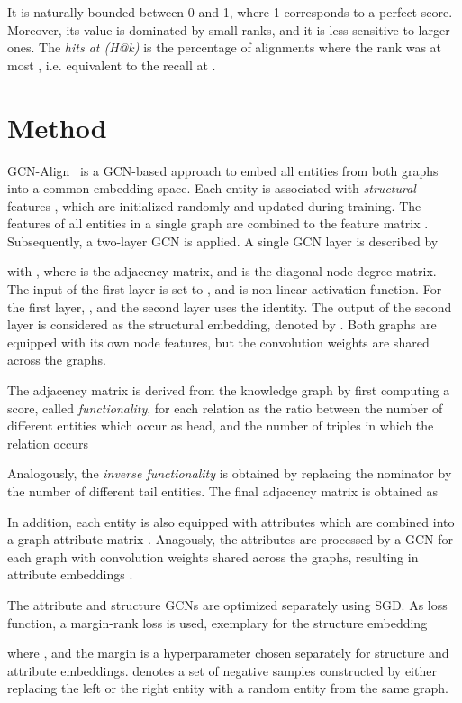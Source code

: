 \documentclass[runningheads]{llncs}
\begin{document}
It is naturally bounded between 0 and 1, where 1 corresponds to a perfect score.
Moreover, its value is dominated by small ranks, and it is less sensitive to larger ones.
The \emph{hits at  (H@k)} is the percentage of alignments where the rank was at most , i.e. equivalent to the recall at .
 \section{Method}
GCN-Align~\cite{DBLP:conf/emnlp/WangLLZ18} is a GCN-based approach to embed all entities from both graphs into a common embedding space.
Each entity  is associated with \emph{structural} features , which are initialized randomly and updated during training.
The features of all entities in a single graph are combined to the feature matrix .
Subsequently, a two-layer GCN is applied.
A single GCN layer is described by

with , where  is the adjacency matrix, and  is the diagonal node degree matrix.
The input of the first layer is set to , and  is non-linear activation function.
For the first layer, , and the second layer uses the identity.
The output of the second layer is considered as the structural embedding, denoted by .
Both graphs are equipped with its own node features, but the convolution weights  are shared across the graphs.

The adjacency matrix is derived from the knowledge graph by first computing a score, called \emph{functionality}, for each relation as the ratio between the number of different entities which occur as head, and the number of triples in which the relation occurs

Analogously, the \emph{inverse functionality}  is obtained by replacing the nominator by the number of different tail entities.
The final adjacency matrix is obtained as


In addition, each entity  is also equipped with attributes  which are combined into a graph attribute matrix .
Anagously, the attributes are processed by a GCN for each graph with convolution weights shared across the graphs, resulting in attribute embeddings .

The attribute and structure GCNs are optimized separately using SGD.
As loss function, a margin-rank loss is used, exemplary for the structure embedding

where , and the margin  is a hyperparameter chosen separately for structure and attribute embeddings.
 denotes a set of negative samples constructed by either replacing the left or the right entity with a random entity from the same graph.
\end{document}
